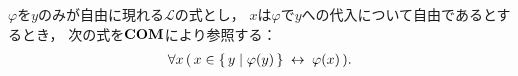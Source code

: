 	\begin{comment}
	\begin{screen}
		\begin{thm}[(ボツ!!!)等号の対称律]\label{thm:symmetry_of_equality}
			$a,b$を類とするとき
			\begin{align}
				\EXTAX,\EQAX \vdash a = b \rarrow b = a.
			\end{align}
		\end{thm}
	\end{screen}
	
	\begin{prf}
		定理\ref{thm:axiom_of_extensionality_equivalent}より
		\begin{align}
			a=b,\ \EQAX \vdash \forall x\, (\, x \in a  \lrarrow x \in b\, )
		\end{align}
		となるが，ここで類である任意の$\varepsilon$項$\tau$に対して
		\begin{align}
			a=b,\ \EQAX \vdash \tau \in a \lrarrow \tau \in b
		\end{align}
		となるが，他方で論理的定理\ref{logicalthm:symmetry_of_equivalence_arrows}より
		\begin{align}
			a=b,\ \EQAX \vdash (\, \tau \in a \lrarrow \tau \in b\, )
				\rarrow (\, \tau \in b \lrarrow \tau \in a\, )
		\end{align}
		が成り立つので，三段論法より
		\begin{align}
			a=b,\ \EQAX \vdash \tau \in b \lrarrow \tau \in a
		\end{align}
		となる．そして$\tau$の任意性より
		\begin{align}
			a=b,\ \EQAX \vdash \forall x\, (\, x \in b  \lrarrow x \in a\, )
		\end{align}
		が成り立つ．外延性の公理より
		\begin{align}
			a=b,\ \EXTAX,\EQAX \vdash \forall x\, (\, x \in b  \lrarrow x \in a\, )
			\rarrow b = a
		\end{align}
		となるので，三段論法より
		\begin{align}
			a=b,\ \EXTAX,\EQAX \vdash b = a
		\end{align}
		となる．最後に演繹定理より
		\begin{align}
			\EXTAX,\EQAX \vdash a = b \rarrow b = a
		\end{align}
		が得られる．
		\QED
	\end{prf}
	\end{comment}
	
	\begin{screen}
		\begin{axm}[内包性公理] 
			$\varphi$を$y$のみが自由に現れる$\mathcal{L}$の式とし，
			$x$は$\varphi$で$y$への代入について自由であるとするとき，
			次の式を$\mbox{\bf COM}$により参照する：
			\begin{align}
				\forall x\, (\, x \in \{\, y \mid \varphi(y)\, \} \hspace{0.25em}\leftrightarrow\hspace{0.25em} \varphi(x)\, ).
			\end{align}
		\end{axm}
	\end{screen}
	
